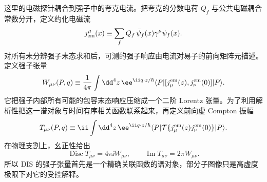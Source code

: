 这里的电磁探针耦合到强子中的夸克电流。把夸克的分数电荷 $Q_f$ 与公共电磁耦合常数分开，定义约化电磁流
\begin{equation*}
 j_{\rm em}^\mu(x)
 \equiv\sum_f Q_f\,\bar\psi_f(x)\gamma^\mu\psi_f(x).
\end{equation*}
对所有未分辨强子末态求和后，可测的强子响应由电流对易子的前向矩阵元描述。定义强子张量
\begin{equation*}
 W_{\mu\nu}(P,q)
 \equiv\frac1{4\pi}
 \int\dd^4 z\,
 \ee^{\ii q\cdot z/\hbar}
 \langle P|[j^{\rm em}_\mu(z),j^{\rm em}_\nu(0)]|P\rangle.
\end{equation*}
它把强子内部所有可能的包容末态响应压缩成一个二阶 Lorentz 张量。为了利用解析性把这一谱对象与时间有序相关函数联系起来，再定义前向虚 Compton 振幅
\begin{equation*}
 T_{\mu\nu}(P,q)
 \equiv\ii\int\dd^4 z\,
 \ee^{\ii q\cdot z/\hbar}
 \langle P|\mathcal T\{j^{\rm em}_\mu(z)j^{\rm em}_\nu(0)\}|P\rangle.
\end{equation*}
在物理支割上，幺正性给出
\begin{equation}
 \boxed{
 \operatorname{Disc}T_{\mu\nu}=4\pi\ii W_{\mu\nu},
 \qquad
 \operatorname{Im}T_{\mu\nu}=2\pi W_{\mu\nu}.}
 \label{eq:dis-optical-theorem-dp13}
\end{equation}
所以 DIS 的强子张量首先是一个精确关联函数的谱对象，部分子图像只是高虚度极限下对它的受控解释。

